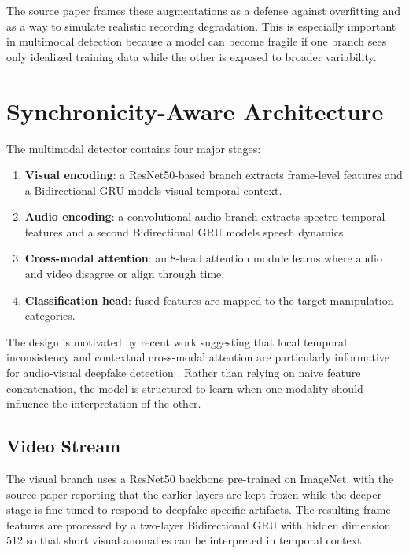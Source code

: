 The source paper frames these augmentations as a defense against overfitting and as a way to simulate realistic recording degradation. This is especially important in multimodal detection because a model can become fragile if one branch sees only idealized training data while the other is exposed to broader variability.

\section{Synchronicity-Aware Architecture}

The multimodal detector contains four major stages:
\begin{enumerate}[label=\arabic*.]
    \item \textbf{Visual encoding}: a ResNet50-based branch extracts frame-level features and a Bidirectional GRU models visual temporal context.
    \item \textbf{Audio encoding}: a convolutional audio branch extracts spectro-temporal features and a second Bidirectional GRU models speech dynamics.
    \item \textbf{Cross-modal attention}: an 8-head attention module learns where audio and video disagree or align through time.
    \item \textbf{Classification head}: fused features are mapped to the target manipulation categories.
\end{enumerate}

The design is motivated by recent work suggesting that local temporal inconsistency and contextual cross-modal attention are particularly informative for audio-visual deepfake detection \cite{Katamneni2024,Haliassos2022,Sabir2022}. Rather than relying on naive feature concatenation, the model is structured to learn when one modality should influence the interpretation of the other.

\subsection{Video Stream}

The visual branch uses a ResNet50 backbone pre-trained on ImageNet, with the source paper reporting that the earlier layers are kept frozen while the deeper stage is fine-tuned to respond to deepfake-specific artifacts. The resulting frame features are processed by a two-layer Bidirectional GRU with hidden dimension 512 so that short visual anomalies can be interpreted in temporal context.

